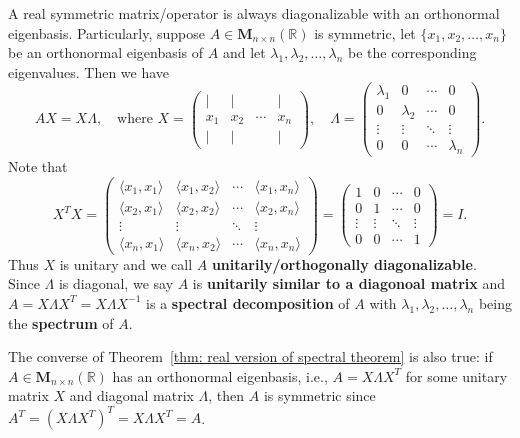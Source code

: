 \documentclass{ctexart}
\newcommand{\M}{\mathbf{M}}
\newcommand{\R}{\mathbb{R}}
\begin{document}
    \begin{myrmk}
        A real symmetric matrix/operator is always diagonalizable with an orthonormal eigenbasis. Particularly, suppose $A \in \M_{n\times n}(\R)$ is symmetric, let $\{x_1, x_2, \ldots, x_n\}$ be an orthonormal eigenbasis of $A$ and let $\lambda_1, \lambda_2, \ldots, \lambda_n$ be the corresponding eigenvalues. Then we have
        $$ AX = X \Lambda, \quad \text{where } X = \begin{pmatrix}
            | & | & & | \\
            x_1 & x_2 & \cdots & x_n \\
            | & | & & |
        \end{pmatrix}, \quad \Lambda = \begin{pmatrix}
            \lambda_1 & 0 & \cdots & 0 \\
            0 & \lambda_2 & \cdots & 0 \\
            \vdots & \vdots & \ddots & \vdots \\
            0 & 0 & \cdots & \lambda_n
        \end{pmatrix}. $$
        Note that
        $$ X^T X = \begin{pmatrix}
            \langle x_1, x_1 \rangle & \langle x_1, x_2 \rangle & \cdots & \langle x_1, x_n \rangle \\
            \langle x_2, x_1 \rangle & \langle x_2, x_2 \rangle & \cdots & \langle x_2, x_n \rangle \\
            \vdots & \vdots & \ddots & \vdots \\
            \langle x_n, x_1 \rangle & \langle x_n, x_2 \rangle & \cdots & \langle x_n, x_n \rangle
        \end{pmatrix}
        = \begin{pmatrix}
            1 & 0 & \cdots & 0 \\
            0 & 1 & \cdots & 0 \\
            \vdots & \vdots & \ddots & \vdots \\
            0 & 0 & \cdots & 1
        \end{pmatrix} = I. $$
        Thus $X$ is unitary and we call $A$ \textbf{unitarily/orthogonally diagonalizable}. Since $\Lambda$ is diagonal, we say $A$ is \textbf{unitarily similar to a diagonoal matrix} and $A=X\Lambda X^T = X \Lambda X^{-1}$ is a \textbf{spectral decomposition} of $A$ with $\lambda_1, \lambda_2, \ldots, \lambda_n$ being the \textbf{spectrum} of $A$.

        The converse of Theorem~\ref{thm: real version of spectral theorem} is also true: if $A\in \M_{n\times n}(\R)$ has an orthonormal eigenbasis, i.e., $A=X\Lambda X^T$ for some unitary matrix $X$ and diagonal matrix $\Lambda$, then $A$ is symmetric since $A^T = (X\Lambda X^T)^T = X \Lambda X^T = A$.
    \end{myrmk} 
\end{document}
